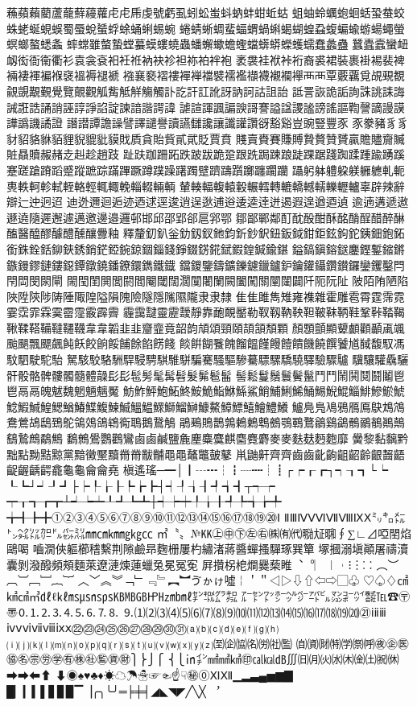 蘓蘋藾藺蘆蘢蘚蘰蘿⾌虍乕虔號虧虱蚓蚣蚩蚪蚋蚌蚶蚯蛄
蛆蚰蛉蠣蚫蛔蛞蛩蛬蛟蛛蛯蜒蜆蜈蜀蜃蛻蜑蜉蜍蛹蜊蜴蜿
蜷蜻蜥蜩蜚蝠蝟蝸蝌蝎蝴蝗蝨蝮蝙蝓蝣蝪蠅螢螟螂螯蟋螽
蟀蟐雖螫蟄螳蟇蟆螻蟯蟲蟠蠏蠍蟾蟶蟷蠎蟒蠑蠖蠕蠢蠡蠱
蠶蠹蠧蠻衄衂衒衙衞衢衫袁衾袞衵衽袵衲袂袗袒袮袙袢袍
袤袰袿袱裃裄裔裘裙裝裹褂裼裴裨裲褄褌褊褓襃褞褥褪褫
襁襄褻褶褸襌褝襠襞襦襤襭襪襯襴襷⾑襾覃覈覊覓覘覡覩
覦覬覯覲覺覽覿觀觚觜觝觧觴觸訃訖訐訌訛訝訥訶詁詛詒
詆詈詼詭詬詢誅誂誄誨誡誑誥誦誚誣諄諍諂諚諫諳諧諤諱
謔諠諢諷諞諛謌謇謚諡謖謐謗謠謳鞫謦謫謾謨譁譌譏譎證
譖譛譚譫譟譬譯譴譽讀讌讎讒讓讖讙讚谺豁谿豈豌豎豐⾗
豕豢豬⾘豸豺貂貉貅貊貍貎貔豼貘戝貭貪貽貲貳貮貶賈賁
賤賣賚賽賺賻贄贅贊贇贏贍贐齎贓賍贔贖赧赭赱赳趁趙跂
趾趺跏跚跖跌跛跋跪跫跟跣跼踈踉跿踝踞踐踟蹂踵踰踴蹊
蹇蹉蹌蹐蹈蹙蹤蹠踪蹣蹕蹶蹲蹼躁躇躅躄躋躊躓躑躔躙躪
躡躬躰軆躱躾軅軈軋軛軣軼軻軫軾輊輅輕輒輙輓輜輟輛輌
輦輳輻輹轅轂輾轌轉轆轎轗轜轢轣轤辜辟辣辭辯辷迚迥迢
迪迯邇迴逅迹迺逑逕逡逍逞逖逋逧逶逵逹迸遏遐遑遒逎遉
逾遖遘遞遨遯遶隨遲邂遽邁邀邊邉邏邨邯邱邵郢郤扈郛鄂
鄒鄙鄲鄰酊酖酘酣酥酩酳酲醋醉醂醢醫醯醪醵醴醺釀釁釉
釋釐釖釟釡釛釼釵釶鈞釿鈔鈬鈕鈑鉞鉗鉅鉉鉤鉈銕鈿鉋鉐
銜銖銓銛鉚鋏銹銷鋩錏鋺鍄錮錙錢錚錣錺錵錻鍜鍠鍼鍮鍖
鎰鎬鎭鎔鎹鏖鏗鏨鏥鏘鏃鏝鏐鏈鏤鐚鐔鐓鐃鐇鐐鐶鐫鐵鐡
鐺鑁鑒鑄鑛鑠鑢鑞鑪鈩鑰鑵鑷鑽鑚鑼鑾钁鑿閂閇閊閔閖閘
閙閠閨閧閭閼閻閹閾闊濶闃闍闌闕闔闖關闡闥闢阡阨阮阯
陂陌陏陋陷陜陞陝陟陦陲陬隍隘隕隗險隧隱隲隰隴⾪隶隸
⾫隹雎雋雉雍襍雜霍雕雹霄霆霈霓霎霑霏霖霙霤霪霰霹霽
霾靄靆靈靂靉靜靠靤靦靨勒靫靱靹鞅靼鞁靺鞆鞋鞏鞐鞜鞨
鞦鞣鞳鞴韃韆韈⾱韋韜⾲韭齏韲竟韶韵頏頌頸頤頡頷頽顆
顏顋顫顯顰顱顴顳颪颯颱颶飄飃飆飩飫餃餉餒餔餘餡餝餞
餤餠餬餮餽餾饂饉饅饐饋饑饒饌饕馗馘馥馭馮馼駟駛駝駘
駑駭駮駱駲駻駸騁騏騅駢騙騫騷驅驂驀驃騾驕驍驛驗驟驢
驥驤驩驫驪骭骰骼髀髏髑髓體髞⾽髟髢髣髦髯髫髮髴髱髷
髻鬆鬘鬚鬟鬢鬣⾾鬥鬧鬨鬩鬪鬮⾿鬯鬲⿀魄魃魏魍魎魑魘
魴鮓鮃鮑鮖鮗鮟鮠鮨鮴鯀鯊鮹鯆鯏鯑鯒鯣鯢鯤鯔鯡鰺鯲鯱
鯰鰕鰔鰉鰓鰌鰆鰈鰒鰊鰄鰮鰛鰥鰤鰡鰰鱇鰲鱆鰾鱚鱠鱧鱶
鱸鳧鳬鳰鴉鴈鳫鴃鴆鴪鴦鶯鴣鴟鵄鴕鴒鵁鴿鴾鵆鵈鵝鵞鵤
鵑鵐鵙鵲鶉鶇鶫鵯鵺鶚鶤鶩鶲鷄鷁鶻鶸鶺鷆鷏鷂鷙鷓鷸鷦
鷭鷯鷽鸚鸛鸞⿄鹵鹹鹽麁麈麋麌麒麕麑麝⿆麥麩麸麪麭靡
黌黎黏黐黔黜點黝黠黥黨黯黴黶黷⿋黹黻黼⿌黽鼇鼈皷鼕
鼡鼬鼾齊⿑齒⿒齔齣齟齠齡齦齧齬齪齷齲齶龕龜⿔龠⿕堯
槇遙瑤─━│┃┄┅┆┇┈┉┊┋┌┍┎┏┐┑┒┓└┕
┖┗┘┙┚┛├┝┞┟┠┡┢┣┤┥┦┧┨┩┪┫┬┭┮
┯┰┱┲┳┴┵┶┷┸┹┺┻┼┽┾┿╀╁╂╃╄╅╆╇
╈╉╊╋①②③④⑤⑥⑦⑧⑨⑩⑪⑫⑬⑭⑮⑯⑰⑱⑲⑳Ⅰ
ⅡⅢⅣⅤⅥⅦⅧⅨⅩ㍉㌔㍍㌧㌶㍑㌍㌦㌫㍊㎜㎝㎞㎎㎏㏄
㎡〝〟№㏍㊤㊥㊦㊧㊨㈱㈲㈹㍾㍽㍼∮∑∟⊿啞𨳝焰鷗喝
嚙㵎俠軀櫛𥡴繫荆𨻶鹼昻麴栅屢杓繡渚蔣醬蟬搔驒琢巽簞
塚摑溺塡顚屠禱瀆囊剝潑醱頻頰麵萊遼漣煉蓮蠟兔冕冤𡨚
屛攢柺梎𤏐爨蔾睢︑︒︳︱︲⁝︙⁚︰︵︶︹︺﹇﹈︷︸
︿﹀︽︾﹁﹂﹃﹄︻︼ゔゕゖ噓￤＇＂◁▷⇩⇧⇦⇨▢♧
♡♤♢㎠㎢㎤㎥㎗ℓ㎘㎳㎲㎱㎰㎅㎆㎇㏋㎐㏔㎖㌢㌖㌘㌕
㌃㌣㍗㍂㌹㌻㌀㌱㍇㌞㌪㍿℡☎〶〠🄀⒈⒉⒊⒋⒌⒍⒎⒏
⒐⑴⑵⑶⑷⑸⑹⑺⑻⑼⑽⑾⑿⒀⒁⒂⒃⒄⒅⒆⒇㉑ⅰⅱⅲ
ⅳⅴⅵⅶⅷⅸⅹ㉒㉓㉔㉕㉖㉗㉘㉙㉚㉛⒜⒝⒞⒟⒠⒡⒢⒣
⒤⒥⒦⒧⒨⒩⒪⒫⒬⒭⒮⒯⒰⒱⒲⒳⒴⒵㉃㈽㈿㈴㈸㈳㈼
㉂㈾㈶㈵㈻㉀㈺㊰㊭㊩㊯㊔㊪㊘㊫㊒㊑㊓㊬㊮㊖⎫⎬⎭⎧
⎨⎩㏌㌅㎟㎣㎦㊞㎈㎉㏈∭㈰㈪㈫㈬㈭㈮㈯㈷㉁➡⮕⬅⬆
⬇◉♠♥♣♦☀☁☂☃☞☜☝☟㊙⓪ⅪⅫ▁▂▃▄▅▆▇
█▏▎▍▌▋▊▉▔▕╭╮╰╯═╞╪╡◢◣◥◤╱╲╳
︐

